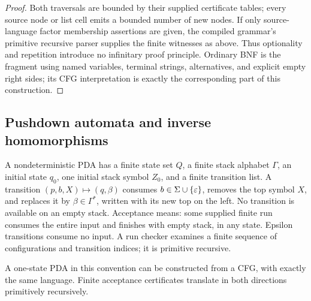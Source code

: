 \begin{proof}
Both traversals are bounded by their supplied certificate tables; every
source node or list cell emits a bounded number of new nodes.  If only
source-language factor membership assertions are given, the compiled
grammar's primitive recursive parser supplies the finite witnesses as
above.  Thus optionality and repetition introduce no infinitary proof
principle.  Ordinary BNF is the fragment using named variables, terminal
strings, alternatives, and explicit empty right sides; its CFG interpretation
is exactly the corresponding part of this construction.
\end{proof}

\subsection{Pushdown automata and inverse homomorphisms}

\begin{definition}
\label{cf:pda-definition}
A nondeterministic PDA has a finite state set $Q$, a finite stack alphabet
$\Gamma$, an initial state $q_0$, one initial stack symbol $Z_0$, and a
finite transition list.  A transition
$(p,b,X)\mapsto(q,\beta)$ consumes $b\in\Sigma\cup\{\varepsilon\}$, removes
the top symbol $X$, and replaces it by $\beta\in\Gamma^*$, written with
its new top on the left.  No transition is available on an empty stack.
Acceptance means: some supplied finite run consumes the entire input and
finishes with empty stack, in any state.  Epsilon transitions consume no
input.  A run checker examines a finite sequence of configurations and
transition indices; it is primitive recursive.
\end{definition}

\begin{theorem}
\label{cf:cfg-to-pda}
A one-state PDA in this convention can be constructed from a CFG, with
exactly the same language.  Finite acceptance certificates translate in
both directions primitively recursively.
\end{theorem}

